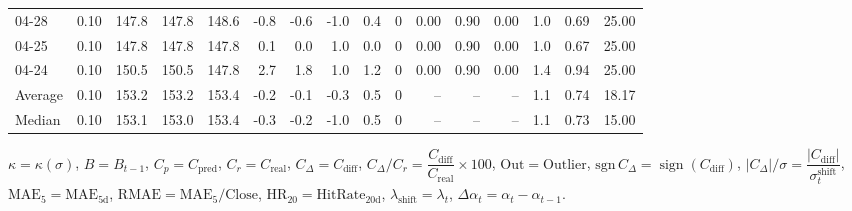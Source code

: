 \begin{threeparttable}
{\begin{tabular}{lrrrrrrrrrrrrrrr}
  04-28 &     0.10 & 147.8 & 147.8 & 148.6 &       -0.8 &           -0.6 &                     -1.0 &                 0.4 &              0 &       0.00 &      0.90 &           0.00 &              1.0 &            0.69 &                  25.00 \\
  04-25 &     0.10 & 147.8 & 147.8 & 147.8 &        0.1 &            0.0 &                      1.0 &                 0.0 &              0 &       0.00 &      0.90 &           0.00 &              1.0 &            0.67 &                  25.00 \\
  04-24 &     0.10 & 150.5 & 150.5 & 147.8 &        2.7 &            1.8 &                      1.0 &                 1.2 &              0 &       0.00 &      0.90 &           0.00 &              1.4 &            0.94 &                  25.00 \\
Average &     0.10 & 153.2 & 153.2 & 153.4 &       -0.2 &           -0.1 &                     -0.3 &                 0.5 &              0 &         -- &        -- &             -- &              1.1 &            0.74 &                  18.17 \\
 Median &     0.10 & 153.1 & 153.0 & 153.4 &       -0.3 &           -0.2 &                     -1.0 &                 0.5 &              0 &         -- &        -- &             -- &              1.1 &            0.73 &                  15.00 \\
\bottomrule
\end{tabular}
}
\begin{tablenotes}\footnotesize
\item $\kappa=\kappa(\sigma)$, $B=B_{t-1}$, $C_p=C_{\text{pred}}$, $C_r=C_{\text{real}}$, $C_\Delta=C_{\text{diff}}$, $C_\Delta/C_r=\dfrac{C_{\text{diff}}}{C_{\text{real}}}\times100$, $\mathrm{Out}=\text{Outlier}$, $\mathrm{sgn}\,C_\Delta=\operatorname{sign}(C_{\text{diff}})$, $|C_\Delta|/\sigma=\dfrac{|C_{\text{diff}}|}{\sigma_t^{\text{shift}}}$, $\mathrm{MAE}_5=\mathrm{MAE}_{5\text{d}}$, $\mathrm{RMAE}= \mathrm{MAE}_5 / \text{Close}$, $\mathrm{HR}_{20}=\mathrm{HitRate}_{20\text{d}}$, 
$\lambda_{\text{shift}}=\lambda_t$, 
$\Delta\alpha_t=\alpha_t-\alpha_{t-1}$.
\end{tablenotes}
\end{threeparttable}
\endgroup

